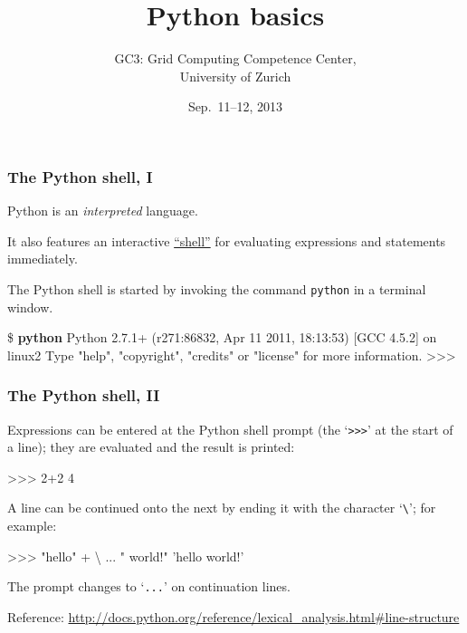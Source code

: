\documentclass[english,serif,mathserif,xcolor=pdftex,dvipsnames,table]{beamer}
\title{%
  Python basics
}
\author[GC3]{%
  GC3: Grid Computing Competence Center, \\
  University of Zurich
}
\date{Sep.~11--12, 2013}
\begin{document}
\maketitle


\begin{frame}[fragile]
  \frametitle{The Python shell, I}
  Python is an \emph{interpreted} language.

  \+
  It also features an interactive
  \href{http://en.wikipedia.org/wiki/REPL}{``shell''} for evaluating
  expressions and statements immediately.

  \+
  The Python shell is started by invoking the command
  \texttt{python} in a terminal window.
\begin{semiverbatim}\small
\$ \textbf{python}
Python 2.7.1+ (r271:86832, Apr 11 2011, 18:13:53)
[GCC 4.5.2] on linux2
Type "help", "copyright", "credits" or "license"
for more information.
>>>
\end{semiverbatim}
\end{frame}

\begin{frame}[fragile]
  \frametitle{The Python shell, II}
  Expressions can be entered at the Python shell prompt (the
  `\texttt{>>>}' at the start of a line); they are evaluated and the
  result is printed:
\begin{semiverbatim}
>>> 2+2
4
\end{semiverbatim}

  \+
  A line can be continued onto the next by ending it with the
  character `\texttt{\textbackslash}'; for example:
\begin{semiverbatim}
>>> "hello" + \textbackslash
... " world!"
'hello world!'
\end{semiverbatim}
  The prompt changes to `\texttt{...}' on continuation lines.

  \+\scriptsize
  Reference:
  \url{http://docs.python.org/reference/lexical_analysis.html#line-structure}
\end{frame}
\end{document}
